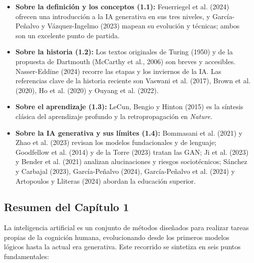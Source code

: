 \begin{itemize}
    \item \textbf{Sobre la definición y los conceptos (1.1):} Feuerriegel et al. (2024) ofrecen una introducción a la IA generativa en sus tres niveles, y García-Peñalvo y Vázquez-Ingelmo (2023) mapean su evolución y técnicas; ambos son un excelente punto de partida.
    \item \textbf{Sobre la historia (1.2):} Los textos originales de Turing (1950) y de la propuesta de Dartmouth (McCarthy et al., 2006) son breves y accesibles. Nasser-Eddine (2024) recorre las etapas y los inviernos de la IA. Las referencias clave de la historia reciente son Vaswani et al. (2017), Brown et al. (2020), Ho et al. (2020) y Ouyang et al. (2022).
    \item \textbf{Sobre el aprendizaje (1.3):} LeCun, Bengio y Hinton (2015) es la síntesis clásica del aprendizaje profundo y la retropropagación en \textit{Nature}.
    \item \textbf{Sobre la IA generativa y sus límites (1.4):} Bommasani et al. (2021) y Zhao et al. (2023) revisan los modelos fundacionales y de lenguaje; Goodfellow et al. (2014) y de la Torre (2023) tratan las GAN; Ji et al. (2023) y Bender et al. (2021) analizan alucinaciones y riesgos sociotécnicos; Sánchez y Carbajal (2023), García-Peñalvo (2024), García-Peñalvo et al. (2024) y Artopoulos y Lliteras (2024) abordan la educación superior.
\end{itemize}

\newpage
{}
\subsection*{Resumen del Capítulo 1}

La inteligencia artificial es un conjunto de métodos diseñados para realizar tareas propias de la cognición humana, evolucionando desde los primeros modelos lógicos hasta la actual era generativa. Este recorrido se sintetiza en seis puntos fundamentales:

